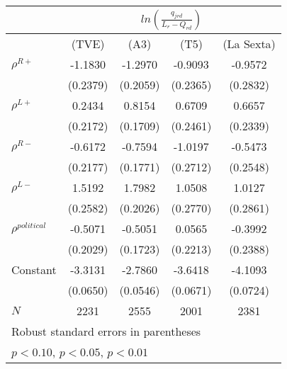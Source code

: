 {
\begin{tabular}{l*{4}{c}}
\hline
&\multicolumn{4}{c}{$   ln\left( \frac{q_{jrd}}{L_{r}-Q_{rd}}  \right)$}\\
\hline
          &\multicolumn{1}{c}{(TVE)}&\multicolumn{1}{c}{(A3)}&\multicolumn{1}{c}{(T5)}&\multicolumn{1}{c}{(La Sexta)}\\
          \hline
\hline
$\rho^{R+}$ &  -1.1830\sym{***}&  -1.2970\sym{***}&  -0.9093\sym{***}&  -0.9572\sym{***}\\
          & (0.2379)         & (0.2059)         & (0.2365)         & (0.2832)         \\
  $\rho^{L+}$  &   0.2434         &   0.8154\sym{***}&   0.6709\sym{***}&   0.6657\sym{***}\\
          & (0.2172)         & (0.1709)         & (0.2461)         & (0.2339)         \\
  $\rho^{R- }$ &  -0.6172\sym{***}&  -0.7594\sym{***}&  -1.0197\sym{***}&  -0.5473\sym{**} \\
          & (0.2177)         & (0.1771)         & (0.2712)         & (0.2548)         \\
$\rho^{L-}$  &   1.5192\sym{***}&   1.7982\sym{***}&   1.0508\sym{***}&   1.0127\sym{***}\\
          & (0.2582)         & (0.2026)         & (0.2770)         & (0.2861)         \\
$\rho^{political}$  &  -0.5071\sym{**} &  -0.5051\sym{***}&   0.0565         &  -0.3992\sym{*}  \\
          & (0.2029)         & (0.1723)         & (0.2213)         & (0.2388)         \\
Constant     &  -3.3131\sym{***}&  -2.7860\sym{***}&  -3.6418\sym{***}&  -4.1093\sym{***}\\
          & (0.0650)         & (0.0546)         & (0.0671)         & (0.0724)         \\
\hline
\(N\)     &     2231         &     2555         &     2001         &     2381         \\
\hline\hline
\multicolumn{5}{l}{\footnotesize Robust standard errors in parentheses}\\
\multicolumn{5}{l}{\footnotesize \sym{*} \(p<0.10\), \sym{**} \(p<0.05\), \sym{***} \(p<0.01\)}\\
\end{tabular}
}
